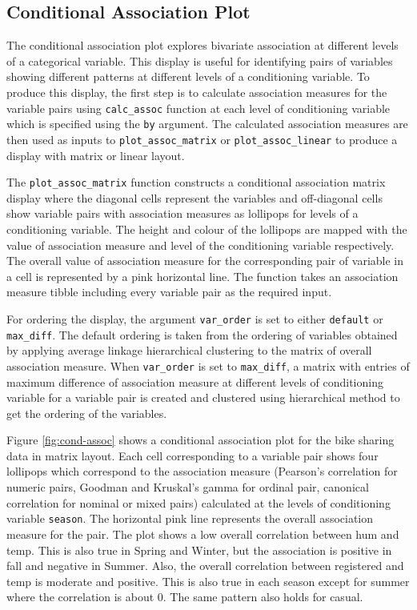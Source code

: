 \hypertarget{conditional-association-plot}{%
\subsection{Conditional Association
Plot}\label{conditional-association-plot}}

The conditional association plot explores bivariate association at
different levels of a categorical variable. This display is useful for
identifying pairs of variables showing different patterns at different
levels of a conditioning variable. To produce this display, the first
step is to calculate association measures for the variable pairs using
\texttt{calc\_assoc} function at each level of conditioning variable
which is specified using the \texttt{by} argument. The calculated
association measures are then used as inputs to
\texttt{plot\_assoc\_matrix} or \texttt{plot\_assoc\_linear} to produce
a display with matrix or linear layout.

The \texttt{plot\_assoc\_matrix} function constructs a conditional
association matrix display where the diagonal cells represent the
variables and off-diagonal cells show variable pairs with association
measures as lollipops for levels of a conditioning variable. The height
and colour of the lollipops are mapped with the value of association
measure and level of the conditioning variable respectively. The overall
value of association measure for the corresponding pair of variable in a
cell is represented by a pink horizontal line. The function takes an
association measure tibble including every variable pair as the required
input.

For ordering the display, the argument \texttt{var\_order} is set to
either \texttt{default} or \texttt{max\_diff}. The default ordering is
taken from the ordering of variables obtained by applying average
linkage hierarchical clustering to the matrix of overall association
measure. When \texttt{var\_order} is set to \texttt{max\_diff}, a matrix
with entries of maximum difference of association measure at different
levels of conditioning variable for a variable pair is created and
clustered using hierarchical method to get the ordering of the
variables.

Figure \ref{fig:cond-assoc} shows a conditional association plot for the
bike sharing data in matrix layout. Each cell corresponding to a
variable pair shows four lollipops which correspond to the association
measure (Pearson's correlation for numeric pairs, Goodman and Kruskal's
gamma for ordinal pair, canonical correlation for nominal or mixed
pairs) calculated at the levels of conditioning variable
\texttt{season}. The horizontal pink line represents the overall
association measure for the pair. The plot shows a low overall
correlation between hum and temp. This is also true in Spring and
Winter, but the association is positive in fall and negative in Summer.
Also, the overall correlation between registered and temp is moderate
and positive. This is also true in each season except for summer where
the correlation is about 0. The same pattern also holds for casual.

